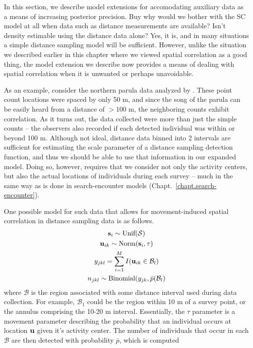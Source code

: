 In this section, we describe model extensions for accomodating
auxiliary data as a means of increasing posterior precision. Buy why
would we bother with the SC model at all when data
such as distance measurements are available? Isn't density estimable
using the distance data alone? Yes, it is, and in many situations a
simple distance sampling model will be sufficient. However, unlike the
situation we described earlier in this chapter where we viewed spatial
correlation as a good thing, the model extension we describe now
provides a means of dealing with spatial correlation when it is
unwanted or perhaps unavoidable.

As an example, consider the northern parula data analyzed by
\citet{chandler_royle:2012}. These point count locations were spaced
by only 50 m, and since the song of the parula can be easily heard
from a distance of $>100$ m, the neighboring counts exhibit
correlation. As it turns out, the data collected were more than just
the simple counts -- the observers also recorded if each detected
individual was within or beyond 100 m. Although not ideal, distance
data binned into 2 intervals are sufficient for estimating the scale
parameter of a distance sampling detection function, and thus we
should be able to use that information in our expanded model. Doing
so, however, requires that we consider not only the activity centers,
but also the actual locations of individuals during each survey --
much in the same way as is done in search-encounter models
(Chapt.~\ref{chapt.search-encounter}). %

One possible model for such data that allows for movement-induced spatial
correlation in distance sampling data is as follows.
\begin{gather*}
  {\bf s}_i \sim \text{Unif}(\mathcal{S}) \\
  {\bf u}_{ik} \sim \text{Norm}({\bf s}_i, \tau) \\
  y_{jkl} = \sum_{i=1}^M I({\bf u}_{ik} \in \mathcal{B}_l) \\
  n_{jkl} \sim \text{Binomial}(y_{jk}, \bar{p}(\mathcal{B}_l)
\end{gather*}
where $\mathcal{B}$ is the region associated with some distance
interval used during data collection. For example, $\mathcal{B}_1$
could be the region within 10 m of a survey point, or the annulus
comprising the 10-20 m interval. Essentially, the $\tau$ parameter is
a movement parameter describing the probability that an individual
occurs at location $\bf u$ given it's activity center. The number of
individuals that occur in each $\mathcal{B}$ are then detected with
probability $\bar{p}$, which is computed

